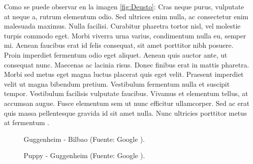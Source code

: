 \textcolor{Rojo}{Como se puede observar en la imagen \ref{fig:Deusto}}: Cras neque purus, vulputate at neque a, rutrum elementum odio. Sed ultrices enim nulla, ac consectetur enim malesuada maximus. Nulla facilisi. Curabitur pharetra tortor nisl, vel molestie turpis commodo eget. Morbi viverra urna varius, condimentum nulla eu, semper mi. Aenean faucibus erat id felis consequat, sit amet porttitor nibh posuere. Proin imperdiet fermentum odio eget aliquet. Aenean quis auctor ante, ut consequat nunc. Maecenas ac lacinia risus. Donec finibus erat in mattis pharetra. Morbi sed metus eget magna luctus placerat quis eget velit. Praesent imperdiet velit ut magna bibendum pretium. Vestibulum fermentum nulla et suscipit tempor. Vestibulum facilisis vulputate faucibus. Vivamus et elementum tellus, at accumsan augue. Fusce elementum sem ut nunc efficitur ullamcorper. Sed ac erat quis massa pellentesque gravida id sit amet nulla. Nunc ultricies porttitor metus at fermentum \cite{Deusto}.\\

\setlength{\fboxsep}{0pt}

\begin{figure}[H]
\centering
\begin{minipage}[h]{.48\linewidth}
\vspace{1.5cm}
\centering
{}
\caption{Guggenheim - Bilbao (Fuente: Google \cite{Gugg}).} \label{fig:Gugg}
\end{minipage}
\hfill
\begin{minipage}[h]{.45\linewidth}
\centering
{}
\caption{Puppy - Guggenheim (Fuente: Google \cite{Puppy}).} \label{fig:Puppy}
\end{minipage}
\end{figure}

